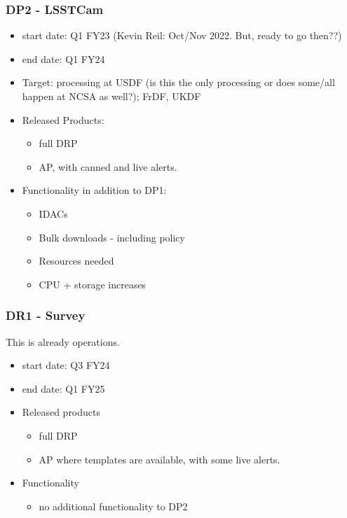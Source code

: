 \subsubsection{DP2 - LSSTCam}
\begin{itemize}
\item start date: Q1 FY23 (Kevin Reil: Oct/Nov 2022. But, ready to go then??)
\item end date: Q1 FY24
\item Target: processing at \gls{USDF} (is this the only processing or does some/all happen at NCSA as well?); FrDF, UKDF
\item Released Products:
\begin{itemize}
\item full \gls{DRP}
\item \gls{AP}, with canned and live alerts.
\end{itemize}
\item Functionality in addition to \gls{DP1}:
\begin{itemize}
\item IDACs
\item Bulk downloads - including policy
\item Resources needed
\item \gls{CPU} + storage increases
\end{itemize}
\end{itemize}
\subsubsection{DR1 - Survey}
This is already operations.

\begin{itemize}
\item start date: Q3 FY24
\item end date: Q1 FY25
\item Released products
\begin{itemize}
\item full \gls{DRP}
\item \gls{AP} where templates are available, with some live alerts.
\end{itemize}
\item Functionality
\begin{itemize}
\item no additional functionality to DP2
\end{itemize}
\end{itemize}
